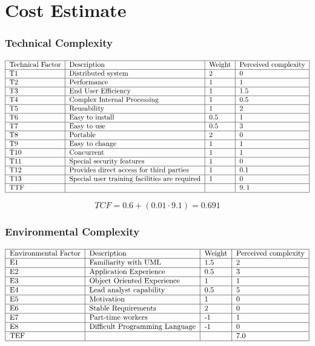 \documentclass{article}
\begin{document}
\newpage

\part{Cost Estimate}

\section{Technical Complexity}

\[
\begin{tabular}{|l|l|l|l|}
\hline
Technical Factor & Description & Weight & Perceived complexity \\ \hline
T1 & Distributed system & 2 & 0 \\ \hline
T2 & Performance & 1 & 1 \\ \hline
T3 & End User Efficiency & 1 & 1.5 \\ \hline
T4 & Complex Internal Processing & 1 & 0.5 \\ \hline
T5 & Reusability & 1 & 2 \\ \hline
T6 & Easy to install & 0.5 & 1 \\ \hline
T7 & Easy to use & 0.5 & 3 \\ \hline
T8 & Portable & 2 & 0 \\ \hline
T9 & Easy to change & 1 & 1 \\ \hline
T10 & Concurrent & 1 & 1 \\ \hline
T11 & Special security features & 1 & 0 \\ \hline
T12 & Provides direct access for third parties & 1 & 0.1 \\ \hline
T13 & Special user training facilities are required & 1 & 0 \\ \hline
TTF &  &  & $9.\,\allowbreak 1$ \\ \hline
\end{tabular}%
\]

\[
TCF=0.6+\left( 0.01\cdot 9.1\right) =\allowbreak 0.691 
\]%
$\,$ \newpage

\section{Environmental Complexity}

\[
\begin{tabular}{|l|l|l|l|}
\hline
Environmental Factor & Description & Weight & Perceived complexity \\ \hline
E1 & Familiarity with UML & 1.5 & 2 \\ \hline
E2 & Application Experience & 0.5 & 3 \\ \hline
E3 & Object Oriented Experience & 1 & 1 \\ \hline
E4 & Lead analyst capability & 0.5 & 5 \\ \hline
E5 & Motivation & 1 & 0 \\ \hline
E6 & Stable Requirements & 2 & 0 \\ \hline
E7 & Part-time workers & -1 & 1 \\ \hline
E8 & Difficult Programming Language & -1 & 0 \\ \hline
TEF &  &  & $7.0$ \\ \hline
\end{tabular}%
\]
\end{document}
